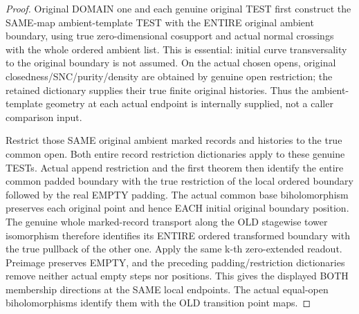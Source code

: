 \begin{proof}
Original DOMAIN one and each genuine original TEST first construct the
SAME-map ambient-template TEST with the ENTIRE original ambient boundary,
using true zero-dimensional cosupport and actual normal crossings with the
whole ordered ambient list. This is essential: initial curve transversality
to the original boundary is not assumed. On the actual chosen opens,
original closedness/SNC/purity/density are obtained by genuine open
restriction; the retained dictionary supplies their true finite original
histories. Thus the ambient-template geometry at each actual endpoint is
internally supplied, not a caller comparison input.

Restrict those SAME original ambient marked records and histories to the
true common open. Both entire record restriction dictionaries apply to
these genuine TESTs. Actual append restriction and the first theorem then
identify the entire common padded boundary with the true restriction of
the local ordered boundary followed by the real EMPTY padding. The actual
common base biholomorphism preserves each original point and hence EACH
initial original boundary position. The genuine whole marked-record
transport along the OLD stagewise tower isomorphism therefore identifies
its ENTIRE ordered transformed boundary with the true pullback of the other
one. Apply the same k-th zero-extended readout. Preimage preserves EMPTY,
and the preceding padding/restriction dictionaries remove neither actual
empty steps nor positions. This gives the displayed BOTH membership
directions at the SAME local endpoints. The actual equal-open
biholomorphisms identify them with the OLD transition point maps.
\end{proof}

